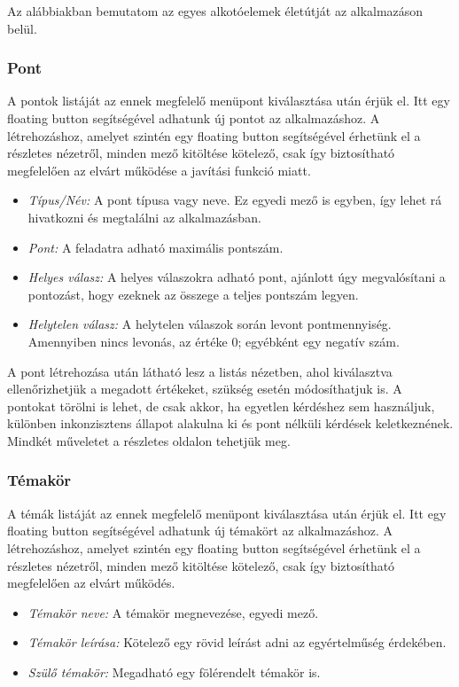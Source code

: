 Az alábbiakban bemutatom az egyes alkotóelemek életútját az alkalmazáson belül.

\subsubsection{Pont}

A pontok listáját az ennek megfelelő menüpont kiválasztása után érjük el.
Itt egy floating button segítségével adhatunk új pontot az alkalmazáshoz.
A létrehozáshoz, amelyet szintén egy floating button segítségével érhetünk el a részletes nézetről, minden mező kitöltése kötelező, csak így biztosítható megfelelően az elvárt működése a javítási funkció miatt.

\begin{itemize}
    \item \emph{Típus/Név:} A pont típusa vagy neve. Ez egyedi mező is egyben, így lehet rá hivatkozni és megtalálni az alkalmazásban.
    \item \emph{Pont:} A feladatra adható maximális pontszám.
    \item \emph{Helyes válasz:} A helyes válaszokra adható pont, ajánlott úgy megvalósítani a pontozást, hogy ezeknek az összege a teljes pontszám legyen.
    \item \emph{Helytelen válasz:} A helytelen válaszok során levont pontmennyiség. Amennyiben nincs levonás, az értéke 0; egyébként egy negatív szám.
\end{itemize}

A pont létrehozása után látható lesz a listás nézetben, ahol kiválasztva ellenőrizhetjük a megadott értékeket, szükség esetén módosíthatjuk is.
A pontokat törölni is lehet, de csak akkor, ha egyetlen kérdéshez sem használjuk, különben inkonzisztens állapot alakulna ki és pont nélküli kérdések keletkeznének.
Mindkét műveletet a részletes oldalon tehetjük meg.

\subsubsection{Témakör}

A témák listáját az ennek megfelelő menüpont kiválasztása után érjük el.
Itt egy floating button segítségével adhatunk új témakört az alkalmazáshoz.
A létrehozáshoz, amelyet szintén egy floating button segítségével érhetünk el a részletes nézetről, minden mező kitöltése kötelező, csak így biztosítható megfelelően az elvárt működés.

\begin{itemize}
    \item \emph{Témakör neve:} A témakör megnevezése, egyedi mező.
    \item \emph{Témakör leírása:} Kötelező egy rövid leírást adni az egyértelműség érdekében.
    \item \emph{Szülő témakör:} Megadható egy fölérendelt témakör is.
\end{itemize}

